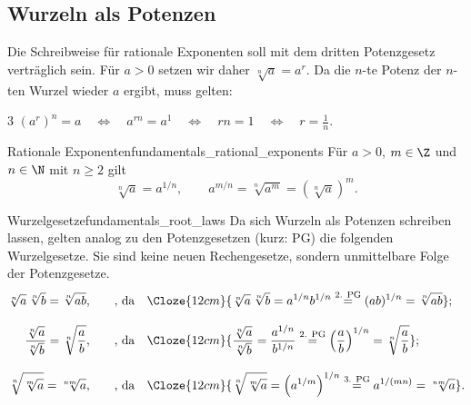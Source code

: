 \subsection{Wurzeln als Potenzen}
\label{subsec:fundamentals_roots_as_powers}

Die Schreibweise für rationale Exponenten soll mit dem dritten Potenzgesetz
verträglich sein. Für $a>0$ setzen wir daher $\sqrt[n]{a}=a^r$. Da die
$n$-te Potenz der $n$-ten Wurzel wieder $a$ ergibt, muss gelten:
\begin{ClozeArea}{3}
  \centering
  $\displaystyle
    (a^r)^n=a
    \quad\Longleftrightarrow\quad
    a^{rn}=a^1
    \quad\Longleftrightarrow\quad
    rn=1
    \quad\Longleftrightarrow\quad
    r=\frac1n.$
\end{ClozeArea}

\begin{KeyPointBox}{Rationale Exponenten}{fundamentals_rational_exponents}
  Für $a>0$, $m\in\Z$ und $n\in\N$ mit $n\geq2$ gilt
  \[
    \sqrt[n]{a}=a^{1/n},
    \qquad
    a^{m/n}=\sqrt[n]{a^m}=\left(\sqrt[n]{a}\right)^m.
  \]
\end{KeyPointBox}

\begin{KeyPointBox}{Wurzelgesetze}{fundamentals_root_laws}
  Da sich Wurzeln als Potenzen schreiben lassen, gelten analog zu den Potenzgesetzen (kurz: PG) die folgenden Wurzelgesetze.
  Sie sind keine neuen Rechengesetze, sondern unmittelbare Folge der Potenzgesetze.
  \begin{align*}
    \sqrt[n]{a}\,\sqrt[n]{b} =\sqrt[n]{ab},
    &\qquad \text{, da} \quad
    \Cloze{12cm}{\sqrt[n]{a}\,\sqrt[n]{b} = a^{1/n}b^{1/n} \overset{\text{2. PG}}{=} (ab)^{1/n} =\sqrt[n]{ab}}; \\[0.9em]
    \frac{\sqrt[n]{a}}{\sqrt[n]{b}} =\sqrt[n]{\frac ab},
    &\qquad \text{, da} \quad
    \Cloze{12cm}{\frac{\sqrt[n]{a}}{\sqrt[n]{b}} =\frac{a^{1/n}}{b^{1/n}} \overset{\text{2. PG}}{=} \left(\frac ab\right)^{1/n} =\sqrt[n]{\frac ab}}; \\[0.9em]
    \sqrt[n]{\sqrt[m]{a}} =\sqrt[nm]{a},
    &\qquad \text{, da} \quad
    \Cloze{12cm}{\sqrt[n]{\sqrt[m]{a}} =\left(a^{1/m}\right)^{1/n} \overset{\text{3. PG}}{=} a^{1/(mn)} =\sqrt[nm]{a}}.
  \end{align*}
\end{KeyPointBox}

